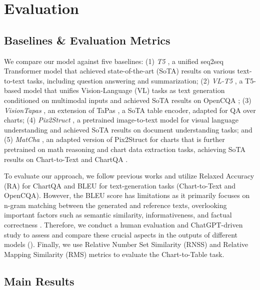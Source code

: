 \section{Evaluation}
 \vspace{-1mm}
\subsection{Baselines \& Evaluation Metrics} \label{subsec:baselines}
We compare our model against five baselines: (1) \emph{T5} \cite{Raffel2020t5}, a unified seq2seq Transformer model that achieved state-of-the-art (SoTA) results on various text-to-text tasks, including question answering and summarization; (2) \emph{VL-T5} \cite{vlt5}, a T5-based model that unifies Vision-Language (VL) tasks as text generation conditioned on multimodal inputs and achieved SoTA results on OpenCQA \cite{open-CQA}; (3) \emph{VisionTapas} \cite{masry-etal-2022-chartqa}, an extension of TaPas \cite{tapas}, a SoTA table encoder, adapted for QA over charts; (4) \emph{Pix2Struct} \cite{lee2022pix2struct}, a pretrained image-to-text model for visual language understanding
and achieved SoTA results on document understanding tasks; and (5) \emph{MatCha} \cite{liu2022matcha}, an adapted version of Pix2Struct for charts that is further pretrained on math reasoning and chart data extraction tasks, achieving SoTA results on Chart-to-Text \cite{chart-to-text-acl} and ChartQA \cite{masry-etal-2022-chartqa}.


To evaluate our approach, we follow previous works \cite{lee2022pix2struct, chart-to-text-acl, masry-etal-2022-chartqa, open-CQA, liu2022matcha} and utilize Relaxed Accuracy (RA) for ChartQA and BLEU \cite{post-2018-call} for text-generation tasks (Chart-to-Text and OpenCQA). However, the BLEU score has limitations as it primarily focuses on n-gram matching between the generated and reference texts, overlooking important factors such as semantic similarity, informativeness, and factual correctness \cite{goyal2022news}.
 Therefore, we conduct a human evaluation and ChatGPT-driven study to assess and compare these crucial aspects in the outputs of different models (). Finally, we  use Relative Number Set Similarity (RNSS) \cite{masry-etal-2022-chartqa} and Relative Mapping Similarity (RMS) \cite{liu2022deplot} metrics to evaluate the Chart-to-Table task. 



\subsection{Main Results}



